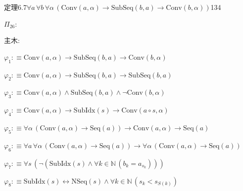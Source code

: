 \begin{fullproof}{定理6.7}{$\forall a\,\forall b\,\forall \alpha\,(\mathrm{Conv}(a,\alpha) \to \mathrm{SubSeq}(b,a) \to \mathrm{Conv}(b,\alpha))$}{134}
\begin{ptree}
\end{ptree}
\noindent$\Pi_{26}$:
\begin{ptree}
\noLine
{}
\noLine
{}
\end{ptree}
\noindent 主木:
\begin{ptree}
\noLine
{}
\end{ptree}
\begin{abbrevlist}
\item $\varphi_{1} :\equiv \mathrm{Conv}(a,\alpha) \to \mathrm{SubSeq}(b,a) \to \mathrm{Conv}(b,\alpha)$
\item $\varphi_{2} :\equiv \mathrm{Conv}(a,\alpha) \to \mathrm{SubSeq}(b,a) \to \mathrm{SubSeq}(b,a)$
\item $\varphi_{3} :\equiv \mathrm{Conv}(a,\alpha) \land \mathrm{SubSeq}(b,a) \land \neg \mathrm{Conv}(b,\alpha)$
\item $\varphi_{4} :\equiv \mathrm{Conv}(a,\alpha) \to \mathrm{SubIdx}(s) \to \mathrm{Conv}(a \circ s,\alpha)$
\item $\varphi_{5} :\equiv \forall \alpha\,(\mathrm{Conv}(a,\alpha) \to \mathrm{Seq}(a)) \to \mathrm{Conv}(a,\alpha) \to \mathrm{Seq}(a)$
\item $\varphi_{6} :\equiv \forall a\,\forall \alpha\,(\mathrm{Conv}(a,\alpha) \to \mathrm{Seq}(a)) \to \forall \alpha\,(\mathrm{Conv}(a,\alpha) \to \mathrm{Seq}(a))$
\item $\varphi_{7} :\equiv \forall s\,(\neg (\mathrm{SubIdx}(s) \land \forall k \in \mathbb{N}\,(b_{k} = a_{s_{k}})))$
\item $\varphi_{8} :\equiv \mathrm{SubIdx}(s) \leftrightarrow \mathrm{NSeq}(s) \land \forall k \in \mathbb{N}\,(s_{k} < s_{S(k)})$

\end{abbrevlist}
\end{fullproof}
